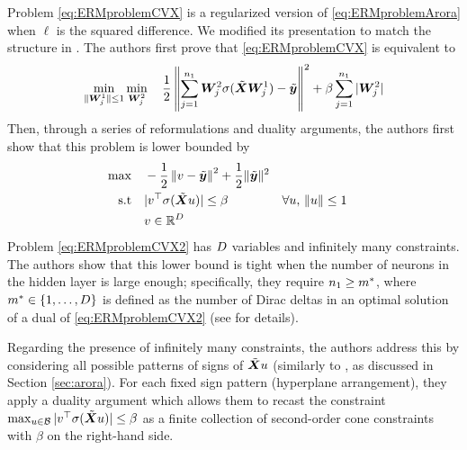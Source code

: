 Problem \eqref{eq:ERMproblemCVX} is a regularized version of \eqref{eq:ERMproblemArora} when $\ell$ is the squared difference. We modified its presentation to match the structure in \cite{pilanci2020neural}. The authors first prove that \eqref{eq:ERMproblemCVX} is equivalent to 
%
\[\min_{\|{\bm{W}}^1_j\| \leq 1} \min_{{\bm{W}}^2_j} \quad \frac{1}{2} \left\|\sum_{j=1}^{n_1} {\bm{W}}^2_j\sigma(\tilde{{\bm{X}}}{\bm{W}}^1_j) - \tilde{{\bm{y}}} \right\|^2 + 
    \beta\sum_{j=1}^{n_1} | {\bm{W}}^2_j|\]
%
Then, through a series of reformulations and duality arguments, the authors first show that this problem is lower bounded by
%
\begin{subequations} \label{eq:ERMproblemCVX2}
\begin{align}
    \max & \quad - \frac{1}{2} \left\|v - \tilde{{\bm{y}}} \right\|^2 + 
    \frac{1}{2}\|\tilde{{\bm{y}}}\|^2\\
    \mbox{s.t} & \quad |v^\top \sigma(\tilde{{\bm{X}}} u )| \leq \beta && \forall u, \, \|u\|\leq 1\\
    &\quad v\in \mathbb{R}^D
\end{align}
\end{subequations}
%
Problem \eqref{eq:ERMproblemCVX2} has $D$ variables and infinitely many constraints.
%
The authors show that this lower bound is tight when the number of neurons in the hidden layer is large enough; specifically, they require $n_1 \geq m^*$, where $m^* \in \{1,\ldots, D\}$ is defined as the number of Dirac deltas in an optimal solution of a dual of \eqref{eq:ERMproblemCVX2} (see \cite{pilanci2020neural} for details). 

Regarding the presence of infinitely many constraints, the authors address this by considering all possible patterns of signs of $\tilde{{\bm{X}}} u$ (similarly to \cite{arora2018understanding}, as discussed in Section \ref{sec:arora}). For each fixed sign pattern (hyperplane arrangement), they apply a duality argument which allows them to recast the constraint $\max_{u\in \mathcal{B}}|v^\top \sigma(\tilde{{\bm{X}}} u )|  \leq \beta$ as a finite collection of second-order cone constraints with $\beta$ on the right-hand side.

